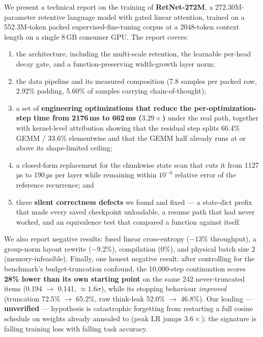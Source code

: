 \documentclass[11pt,openany]{article}
\begin{document}
We present a technical report on the training of \textbf{RetNet-272M}, a 272.30M-parameter
retentive language model with gated linear attention, trained on a 552.3M-token packed
supervised-fine-tuning corpus at a 2048-token context length on a single 8\,GB consumer
GPU. The report covers:

\begin{enumerate}
\item the architecture, including the multi-scale retention, the learnable per-head decay
      gate, and a function-preserving width-growth layer norm;
\item the data pipeline and its measured composition (7.8 samples per packed row, 2.92\%
      padding, 5.60\% of samples carrying chain-of-thought);
\item a set of \textbf{engineering optimizations that reduce the per-optimization-step time
      from 2176\,ms to 662\,ms ($3.29\times$)} under the real  path, together
      with kernel-level attribution showing that the residual step splits 66.4\% GEMM /
      33.6\% elementwise and that the GEMM half already runs at or above its
      shape-limited ceiling;
\item a closed-form replacement for the chunkwise state scan that cuts it from 1127\,µs to
      190\,µs per layer while remaining within $10^{-6}$ relative error of the reference
      recurrence; and
\item three \textbf{silent correctness defects} we found and fixed --- a 
      state-dict prefix that made every saved checkpoint unloadable, a resume path that had
      never worked, and an equivalence test that compared a function against itself.
\end{enumerate}

We also report negative results: fused linear cross-entropy ($-13\%$ throughput), a
group-norm layout rewrite ($-9.2\%$),  compilation (0\%), and physical
batch size 2 (memory-infeasible). Finally, one honest negative result: after controlling for
the benchmark's budget-truncation confound, the 10,000-step continuation scores \textbf{28\%
lower than its own starting point} on the same 242 never-truncated items (0.194 $\rightarrow$
0.141, $\approx 1.6\sigma$), while its stopping behaviour \emph{improved} (truncation
72.5\% $\rightarrow$ 65.2\%, raw think-leak 52.0\% $\rightarrow$ 46.8\%). Our leading ---
\textbf{unverified} --- hypothesis is catastrophic forgetting from restarting a full cosine
schedule on weights already annealed to  (peak LR jumps $3.6\times$): the
signature is falling training loss with falling task accuracy.
\end{document}
